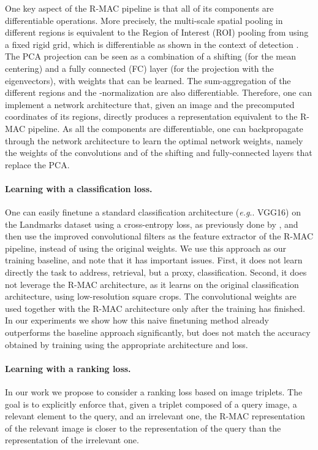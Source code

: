 \documentclass[twocolumn]{svjour3}          \smartqed  \usepackage{graphicx}
\makeatletter
\DeclareRobustCommand\onedot{\futurelet\@let@token\@onedot}
\def\@onedot{\ifx\@let@token.\else.\null\fi\xspace}
\def\eg{\emph{e.g}\onedot} \def\Eg{\emph{E.g}\onedot}
\makeatother
\begin{document}
One key aspect of the R-MAC pipeline is that all of its components are differentiable operations. More precisely, the multi-scale spatial pooling in different regions is equivalent to the Region of Interest (ROI) pooling from \cite{He2014} using a fixed rigid grid, which is differentiable
as shown in the context of detection \citep{Girshick2015}.
The PCA projection can be seen as a combination of a shifting (for the mean centering) and a fully connected (FC) layer (for the projection with the eigenvectors), with weights that can be learned. The sum-aggregation of the different regions and the -normalization are also differentiable.
Therefore, one can implement a network architecture that, given an image and the precomputed coordinates of its regions, directly produces a representation equivalent to the R-MAC pipeline.
As all the components are differentiable, one can backpropagate through the network architecture to learn the optimal network weights, namely the weights of the convolutions and of the shifting and fully-connected layers that replace the PCA.

\paragraph{Learning with a classification loss.}
One can easily finetune a standard classification architecture (\eg VGG16) on the Landmarks dataset using a cross-entropy loss, as previously done by \cite{Babenko2014}, and then use the improved convolutional filters as the feature extractor of the R-MAC pipeline, instead of using the original weights. We use this approach as our training baseline, and note that it has important issues.
First, it does not learn directly the task to address, retrieval, but a proxy, classification.
Second, it does not leverage the R-MAC architecture, as it learns on the original classification architecture, using low-resolution square crops.
The convolutional weights are used together with the R-MAC architecture only after the training has finished.
In our experiments we show how this naive finetuning method already outperforms the baseline approach significantly, but does not match the accuracy obtained by training using the appropriate architecture and loss.

\paragraph{Learning with a ranking loss.}
In our work we propose to consider a ranking loss based on image triplets. The goal is to explicitly enforce that, given a triplet composed of a query image, a relevant element to the query, and an irrelevant one, the R-MAC representation of the relevant image is closer to the representation of the query than the representation of the irrelevant one. 
\end{document}
